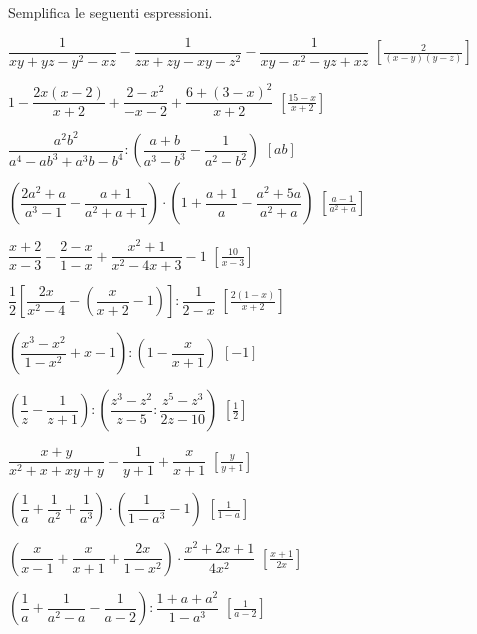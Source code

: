 \begin{esercizio}[\Ast]
\label{ese:19.38}
Semplifica le seguenti espressioni.
\begin{enumeratea}
 \item $\dfrac{1}{xy+yz-y^{2}-xz}-\dfrac{1}{zx+zy-xy-z^{2}}-
        \dfrac{1}{xy-x^{2}-yz+xz}$
  \hfill $\left[\frac{2}{(x-y)(y-z)}\right]$
 \item $1-\dfrac{2x(x-2)}{x+2}+\dfrac{2-x^{2}}{-x-2}+
        \dfrac{6+(3-x)^{2}}{x+2}$
  \hfill $\left[\frac{15-x}{x+2}\right]$
 \item $\dfrac{a^{2}b^{2}}{a^{4}-ab^{3}+a^{3}b-b^{4}}:
        \left(\dfrac{a+b}{a^{3}-b^{3}}-\dfrac{1}{a^{2}-b^{2}}\right)$
  \hfill $\left[ab\right]$
 \item $\left(\dfrac{2a^{2}+a}{a^{3}-1}-\dfrac{a+1}{a^{2}+a+1}\right)\cdot 
        \left(1+\dfrac{a+1}{a}-\dfrac{a^{2}+5a}{a^{2}+a}\right)$
  \hfill $\left[\frac{a-1}{a^{2}+a}\right]$
 \item $\dfrac{x+2}{x-3}-\dfrac{2-x}{1-x}+\dfrac{x^{2}+1}{x^{2}-4x+3}-1$
  \hfill $\left[\frac{10}{x-3}\right]$
 \item $\dfrac{1}{2}\left[\dfrac{2x}{x^{2}-4}-
        \left(\dfrac{x}{x+2}-1\right)\right]:\dfrac{1}{2-x}$
  \hfill $\left[\frac{2(1-x)}{x+2}\right]$
 \item $\left(\dfrac{x^{3}-x^{2}}{1-x^{2}}+x-1\right):
        \left(1-\dfrac{x}{x+1}\right)$
  \hfill $\left[-1\right]$
 \item $\left(\dfrac{1}{z}-\dfrac{1}{z+1}\right):
        \left(\dfrac{z^{3}-z^{2}}{z-5}:\dfrac{z^{5}-z^{3}}{2z-10}\right)$
  \hfill $\left[\frac{1}{2}\right]$
 \item $\dfrac{x+y}{x^{2}+x+xy+y}-\dfrac{1}{y+1}+\dfrac{x}{x+1}$
  \hfill $\left[\frac{y}{y+1}\right]$
 \item $\left(\dfrac{1}{a}+\dfrac{1}{a^{2}}+\dfrac{1}{a^{3}}\right)\cdot 
        \left(\dfrac{1}{1-a^{3}}-1\right)$
  \hfill $\left[\frac{1}{1-a}\right]$
 \item $\left(\dfrac{x}{x-1}+\dfrac{x}{x+1}+\dfrac{2x}{1-x^{2}}\right)\cdot 
       {\dfrac{x^{2}+2x+1}{4x^{2}}}$
  \hfill $\left[\frac{x+1}{2x}\right]$
 \item $\left(\dfrac{1}{a}+\dfrac{1}{a^{{2}}-a}-\dfrac{1}{a-2}\right):
        \dfrac{1+a+a^{2}}{1-a^{3}}$
  \hfill $\left[\frac{1}{a-2}\right]$
\end{enumeratea}
\end{esercizio}


